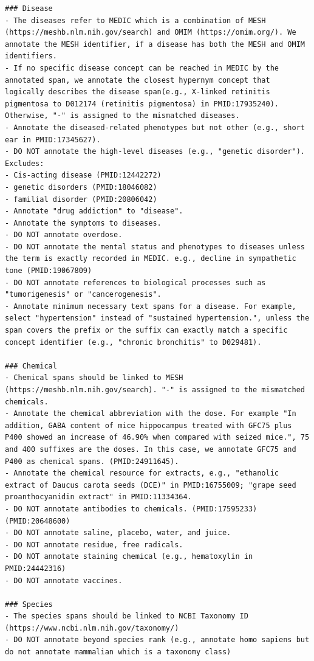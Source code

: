\begin{lstlisting}
### Disease
- The diseases refer to MEDIC which is a combination of MESH (https://meshb.nlm.nih.gov/search) and OMIM (https://omim.org/). We annotate the MESH identifier, if a disease has both the MESH and OMIM identifiers.
- If no specific disease concept can be reached in MEDIC by the annotated span, we annotate the closest hypernym concept that logically describes the disease span(e.g., X-linked retinitis pigmentosa to D012174 (retinitis pigmentosa) in PMID:17935240). Otherwise, "-" is assigned to the mismatched diseases.
- Annotate the diseased-related phenotypes but not other (e.g., short ear in PMID:17345627).
- DO NOT annotate the high-level diseases (e.g., "genetic disorder").
Excludes:
- Cis-acting disease (PMID:12442272)
- genetic disorders (PMID:18046082)
- familial disorder (PMID:20806042)
- Annotate "drug addiction" to "disease".
- Annotate the symptoms to diseases.
- DO NOT annotate overdose.
- DO NOT annotate the mental status and phenotypes to diseases unless the term is exactly recorded in MEDIC. e.g., decline in sympathetic tone (PMID:19067809)
- DO NOT annotate references to biological processes such as "tumorigenesis" or "cancerogenesis".
- Annotate minimum necessary text spans for a disease. For example, select "hypertension" instead of "sustained hypertension.", unless the span covers the prefix or the suffix can exactly match a specific concept identifier (e.g., "chronic bronchitis" to D029481).

### Chemical
- Chemical spans should be linked to MESH (https://meshb.nlm.nih.gov/search). "-" is assigned to the mismatched chemicals.
- Annotate the chemical abbreviation with the dose. For example "In addition, GABA content of mice hippocampus treated with GFC75 plus P400 showed an increase of 46.90% when compared with seized mice.", 75 and 400 suffixes are the doses. In this case, we annotate GFC75 and P400 as chemical spans. (PMID:24911645).
- Annotate the chemical resource for extracts, e.g., "ethanolic extract of Daucus carota seeds (DCE)" in PMID:16755009; "grape seed proanthocyanidin extract" in PMID:11334364.
- DO NOT annotate antibodies to chemicals. (PMID:17595233) (PMID:20648600)
- DO NOT annotate saline, placebo, water, and juice.
- DO NOT annotate residue, free radicals.
- DO NOT annotate staining chemical (e.g., hematoxylin in PMID:24442316)
- DO NOT annotate vaccines.

### Species
- The species spans should be linked to NCBI Taxonomy ID (https://www.ncbi.nlm.nih.gov/taxonomy/)
- DO NOT annotate beyond species rank (e.g., annotate homo sapiens but do not annotate mammalian which is a taxonomy class)


\end{lstlisting}
